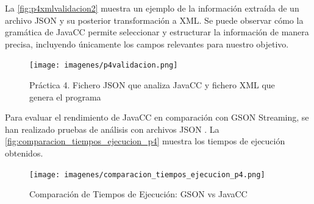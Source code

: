 La \autoref{fig:p4xmlvalidacion2} muestra un ejemplo de la información extraída de un archivo JSON y su posterior transformación a XML. Se puede observar cómo la gramática de JavaCC permite seleccionar y estructurar la información de manera precisa, incluyendo únicamente los campos relevantes para nuestro objetivo.





\begin{figure}[H]
	\centering
	\texttt{[image: imagenes/p4validacion.png]}
	\caption{\label{fig:p4xmlvalidacion2}Práctica 4. Fichero JSON que analiza JavaCC y fichero XML que genera el programa}
\end{figure}




Para evaluar el rendimiento de JavaCC en comparación con GSON Streaming, se han realizado pruebas de análisis con archivos JSON %
. La \autoref{fig:comparacion_tiempos_ejecucion_p4} muestra los tiempos de ejecución obtenidos.



\begin{figure}[H]
	\centering
	\texttt{[image: imagenes/comparacion\_tiempos\_ejecucion\_p4.png]}
	\caption{\label{fig:comparacion_tiempos_ejecucion_p4}Comparación de Tiempos de Ejecución: GSON vs JavaCC}
\end{figure}

